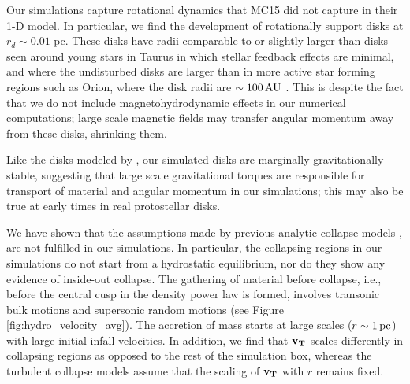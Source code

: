\documentclass[../dissertation.tex]{subfiles}
\begin{document}
Our simulations capture rotational dynamics that MC15 did not capture in their 1-D model.  
In particular, we find the development of rotationally support disks at $r_d \sim 0.01$ pc.  
These disks have radii comparable to  or slightly larger than disks seen around 
young stars in Taurus \citep{1999AJ....117.1490P} in which stellar feedback effects are minimal,
and where the undisturbed disks are larger than in more active star forming regions such as Orion, 
where the disk radii are $\sim 100\,\rm AU$ \citep{2011ARA&A..49...67W}.  
This is despite the fact that we do not include magnetohydrodynamic effects 
in our numerical computations;  large scale magnetic fields may transfer angular 
momentum away from these disks, shrinking them.  

Like the disks modeled by \citet{2010ApJ...708.1585K},
our simulated disks are 
marginally gravitationally stable, suggesting that large scale gravitational torques are 
responsible for transport of material and angular momentum in our simulations; this may
also be true at early times in real protostellar disks.  

We have shown that the assumptions made by previous analytic collapse models
\citep{1977ApJ...214..488S,1992ApJ...396..631M,1997ApJ...476..750M,2003ApJ...585..850M}, 
are not fulfilled in our simulations.  In particular, 
the collapsing regions in our simulations do not start from a hydrostatic equilibrium, nor 
do they show any evidence of inside-out collapse.  The gathering of material before collapse, i.e.,
before the central cusp in the density power law is formed, involves transonic bulk motions 
and supersonic random motions (see Figure \ref{fig:hydro_velocity_avg}). The accretion of mass starts at large 
scales ($r\sim 1\,\rm pc$) with large initial infall velocities.  In addition, we find that $\mathbf{v_T}$ 
scales differently in collapsing regions as opposed to the rest of the simulation box, 
whereas the turbulent collapse models \citep{1997ApJ...476..750M,2003ApJ...585..850M} assume 
that the scaling of $\mathbf{v_T}$ with $r$ remains fixed.  

\end{document}
